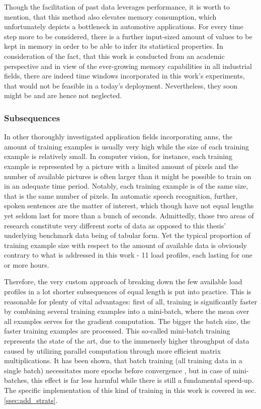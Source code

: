 Though the facilitation of past data leverages performance, it is worth to mention, that this method also elevates memory consumption, which unfortunately depicts a bottleneck in automotive applications.
For every time step more to be considered, there is a further input-sized amount of values to be kept in memory in order to be able to infer its statistical properties.
In consideration of the fact, that this work is conducted from an academic perspective and in view of the ever-growing memory capabilities in all industrial fields, there are indeed time windows incorporated in this work's experiments, that would not be feasible in a today's deployment.  
Nevertheless, they soon might be and are hence not neglected.

\subsubsection{Subsequences}
In other thoroughly investigated application fields incorporating \glspl{ann}, the amount of training examples is usually very high while the size of each training example is relatively small.
In computer vision, for instance, each training example is represented by a picture with a limited amount of pixels and the number of available pictures is often larger than it might be possible to train on in an adequate time period.
Notably, each training example is of the same size, that is the same number of pixels.
In automatic speech recognition, further, spoken sentences are the matter of interest, which though have not equal lengths yet seldom last for more than a bunch of seconds. 
Admittedly, those two areas of research constitute very different sorts of data as opposed to this thesis' underlying benchmark data being of tabular form.
Yet the typical proportion of training example size with respect to the amount of available data is obviously contrary to what is addressed in this work - 11 load profiles, each lasting for one or more hours.

Therefore, the very custom approach of breaking down the few available load profiles in a lot shorter subsequences of equal length is put into practice.
This is reasonable for plenty of vital advantages: first of all, training is significantly faster by combining several training examples into a mini-batch, where the mean over all examples serves for the gradient computation.
The bigger the batch size, the faster training examples are processed.
This so-called mini-batch training represents the state of the art, due to the immensely higher throughput of data caused by utilizing parallel computation through more efficient matrix multiplications.
It has been shown, that batch training (all training data in a single batch) necessitates more epochs before convergence \cite{WiRa2003}, but in case of mini-batches, this effect is far less harmful while there is still a fundamental speed-up.
The specific implementation of this kind of training in this work is covered in sec. \ref{ssec:add_strats}.


